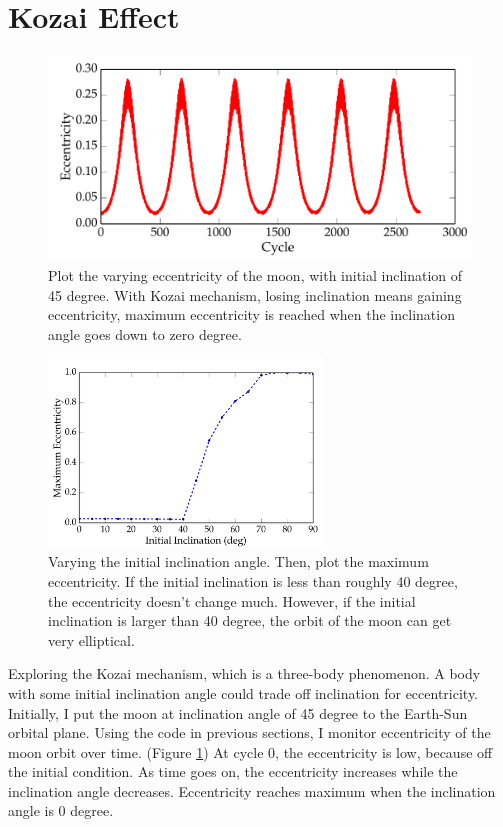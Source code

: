 \documentclass[11pt,letterpaper]{article}
\begin{document}
\section{Kozai Effect}

\begin{figure}[h!]
	\centering
	\includegraphics[height = 0.25\textheight]{Kozai_Ecc_Cycle}
	\caption{Plot the varying eccentricity of the moon, with initial inclination of 45 degree. With Kozai mechanism, losing inclination means gaining eccentricity, maximum eccentricity is reached when the inclination angle goes down to zero degree.}
	\label{fig:Kozai_Ecc_Cycle}
\end{figure}

\begin{figure}[h!]
	\centering
	\includegraphics[width = 0.65\textwidth]{Max_Ecc}
	\caption{Varying the initial inclination angle. Then, plot the maximum eccentricity. If the initial inclination is less than roughly 40 degree, the eccentricity doesn't change much. However, if the initial inclination is larger than 40 degree, the orbit of the moon can get very elliptical.}
	\label{fig:Max_Ecc}
\end{figure}

Exploring the Kozai mechanism, which is a three-body phenomenon. A body with some initial inclination angle could trade off inclination for eccentricity. Initially, I put the moon at inclination angle of 45 degree to the Earth-Sun orbital plane. Using the code in previous sections, I monitor eccentricity of the moon orbit over time. (Figure \ref{fig:Kozai_Ecc_Cycle}) At cycle 0, the eccentricity is low, because off the initial condition. As time goes on, the eccentricity increases while the inclination angle decreases. Eccentricity reaches maximum when the inclination angle is 0 degree.
\end{document}
